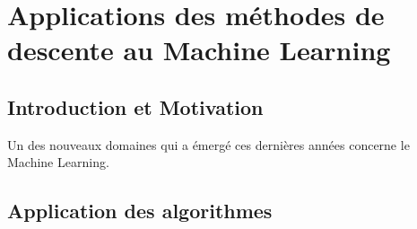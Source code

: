 \chapter{Applications des méthodes de descente au Machine Learning}
\section{Introduction et Motivation}
Un des nouveaux domaines qui a émergé ces dernières années concerne le Machine Learning. 
\section{Application des algorithmes}